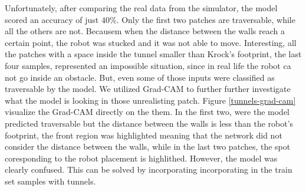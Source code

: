 \documentclass[../document.tex]{subfiles}
\begin{document}
Unfortunately, after comparing the real data from the simulator, the model scored an accuracy of just $40\%$. Only the first two patches are traversable, while all the others are not. Becausem when the distance between the walls reach a certain point, the robot was stucked and it was not able to move. Interesting, all the patches with a space inside the tunnel smaller than Krock's footprint, the last four samples, represented an impossible situation, since in real life the robot ca not go inside an obstacle. But, even some of those inputs were classified as traversable by the model. We utilized Grad-CAM to further further investigate what the model is looking in those unrealisting patch. Figure \ref{tunnels-grad-cam} visualize the Grad-CAM directly on the them. In the first two, were the model predicted traversable but the distance between the walls is less than the robot's footprint, the front region was highlighted meaning that the network did not consider the distance between the walls, while in the last two patches, the spot coresponding to the robot placement is highlithed. However, the model was clearly confused. This can be solved by incorporating  incorporating in the train set samples with tunnels.
\end{document}
